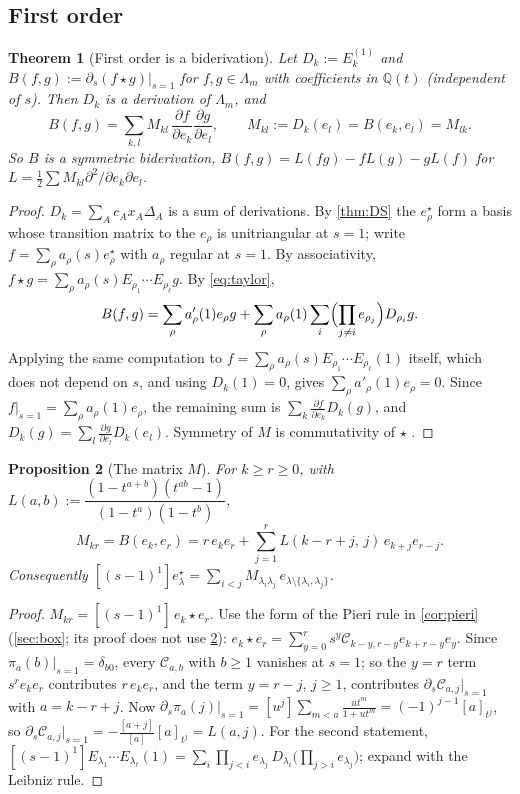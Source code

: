 \documentclass[11pt]{amsart}
\newtheorem{theorem}{Theorem}[section]
\newtheorem{proposition}[theorem]{Proposition}
\theoremstyle{definition}
\theoremstyle{remark}
\numberwithin{equation}{section}
\newcommand{\Lam}{\Lambda}
\begin{document}
\subsection{First order}
\begin{theorem}[First order is a biderivation]\label{thm:bider}
Let $D_k:=E_k^{(1)}$ and $B(f,g):=\partial_s(f\star g)|_{s=1}$ for $f,g\in\Lam_m$ with coefficients in $\mathbb{Q}(t)$ (independent of $s$). Then $D_k$ is a derivation of $\Lam_m$, and
\[ B(f,g)=\sum_{k,l}M_{kl}\,\frac{\partial f}{\partial e_k}\frac{\partial g}{\partial e_l},\qquad M_{kl}:=D_k(e_l)=B(e_k,e_l)=M_{lk}. \]
So $B$ is a symmetric biderivation, $B(f,g)=L(fg)-fL(g)-gL(f)$ for $L=\frac12\sum M_{kl}\partial^2/\partial e_k\partial e_l$.
\end{theorem}
\begin{proof}
$D_k=\sum_Ac_Ax_A\Delta_A$ is a sum of derivations. By \cref{thm:DS} the $e^\star_\rho$ form a basis whose transition matrix to the $e_\rho$ is unitriangular at $s=1$; write $f=\sum_\rho a_\rho(s)e^\star_\rho$ with $a_\rho$ regular at $s=1$. By associativity, $f\star g=\sum_\rho a_\rho(s)E_{\rho_1}\cdots E_{\rho_\ell}g$. By \eqref{eq:taylor},
\[ B(f,g)=\sum_\rho a'_\rho(1)e_\rho g+\sum_\rho a_\rho(1)\sum_i\Bigl(\prod_{j\ne i}e_{\rho_j}\Bigr)D_{\rho_i}g . \]
Applying the same computation to $f=\sum_\rho a_\rho(s)E_{\rho_1}\cdots E_{\rho_\ell}(1)$ itself, which does not depend on $s$, and using $D_k(1)=0$, gives $\sum_\rho a'_\rho(1)e_\rho=0$. Since $f|_{s=1}=\sum_\rho a_\rho(1)e_\rho$, the remaining sum is $\sum_k\frac{\partial f}{\partial e_k}D_k(g)$, and $D_k(g)=\sum_l\frac{\partial g}{\partial e_l}D_k(e_l)$. Symmetry of $M$ is commutativity of $\star$ \cite{Hikita25}.
\end{proof}

\begin{proposition}[The matrix $M$]\label{prop:M}
For $k\ge r\ge0$, with $L(a,b):=\dfrac{(1-t^{a+b})(t^{ab}-1)}{(1-t^a)(1-t^b)}$,
\[ M_{kr}=B(e_k,e_r)=r\,e_ke_r+\sum_{j=1}^{r}L(k-r+j,\,j)\,e_{k+j}e_{r-j}. \]
Consequently $[(s-1)^1]e^\star_\lambda=\sum_{i<j}M_{\lambda_i\lambda_j}\,e_{\lambda\setminus\{\lambda_i,\lambda_j\}}$.
\end{proposition}
\begin{proof}
$M_{kr}=[(s-1)^1]\,e_k\star e_r$. Use the form of the Pieri rule in \cref{cor:pieri} (\cref{sec:box}; its proof does not use \cref{prop:M}): $e_k\star e_r=\sum_{y=0}^{r}s^y\mathcal C_{k-y,r-y}e_{k+r-y}e_y$. Since $\pi_a(b)|_{s=1}=\delta_{b0}$, every $\mathcal C_{a,b}$ with $b\ge1$ vanishes at $s=1$; so the $y=r$ term $s^re_ke_r$ contributes $r\,e_ke_r$, and the term $y=r-j$, $j\ge1$, contributes $\partial_s\mathcal C_{a,j}|_{s=1}$ with $a=k-r+j$. Now $\partial_s\pi_a(j)|_{s=1}=[u^j]\sum_{m<a}\frac{ut^m}{1+ut^m}=(-1)^{j-1}[a]_{t^j}$, so $\partial_s\mathcal C_{a,j}|_{s=1}=-\frac{[a+j]}{[a]}[a]_{t^j}=L(a,j)$. For the second statement, $[(s-1)^1]E_{\lambda_1}\cdots E_{\lambda_\ell}(1)=\sum_i\prod_{j<i}e_{\lambda_j}\,D_{\lambda_i}\bigl(\prod_{j>i}e_{\lambda_j}\bigr)$; expand with the Leibniz rule.
\end{proof}
\end{document}
